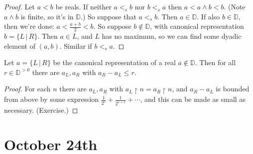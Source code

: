 \begin{proof}
Let $a<b$ be reals. If neither $a <_s b$ nor $b <_s a$ then $a < a\wedge b < b$. (Note $a\wedge b$ is finite, so it's in $\mathbb{D}$.) So suppose that $a <_s b$. Then $a\in \mathbb{D}$. If also $b\in\mathbb{D}$, then we're done:
$a < \frac{a+b}2 < b$. So suppose $b\notin \mathbb{D}$, with canonical representation $b = \{ L \,|\, R\}$. Then $a\in L$,
and $L$ has no maximum, so we can find some dyadic element of $(a,b)$. Similar if $b <_s a$.
\end{proof}

\begin{lemma}
Let $a = \{ L \,|\, R \}$ be the canonical representation of a real $a\notin \mathbb{D}$. Then for all $r\in \mathbb{D}^{>0}$ there are $a_L, a_R$ with $a_R-a_L\le r$. 
\end{lemma}

\begin{proof}
For each $n$ there are $a_L,a_R$ with $a_L\restriction n = a_R\restriction n$, and $a_R-a_L$ is bounded from above by some expression $\frac1{2^s} + \frac{1}{2^{s+1}}+\cdots$, and this can be made as small as necessary. (Exercise.)
\end{proof}

\section*{October 24th}

